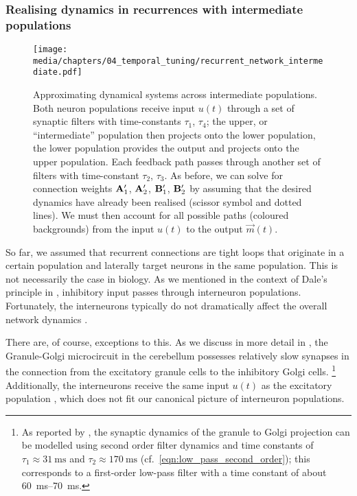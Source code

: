 \subsubsection{Realising dynamics in recurrences with intermediate populations}

\begin{figure}
	\texttt{[image: media/chapters/04\_temporal\_tuning/recurrent\_network\_intermediate.pdf]}
	\caption[Approximating dynamical systems across intermediate populations]{Approximating dynamical systems across intermediate populations. Both neuron populations receive input $u(t)$ through a set of synaptic filters with time-constants $\tau_1$, $\tau_4$; the upper, or \enquote{intermediate} population then projects onto the lower population, the lower population provides the output and projects onto the upper population. Each feedback path passes through another set of filters with time-constant $\tau_2$, $\tau_3$.
	As before, we can solve for connection weights $\mathbf{A}_1'$, $\mathbf{A}_2'$, $\mathbf{B}_1'$, $\mathbf{B}_2'$ by assuming that the desired dynamics have already been realised (scissor symbol and dotted lines).
	We must then account for all possible paths (coloured backgrounds) from the input $u(t)$ to the output $\vec m(t)$.
	}
	\label{fig:recurrent_network_intermediate}
\end{figure}

So far, we assumed that recurrent connections are tight loops that originate in a certain population and laterally target neurons in the same population.
This is not necessarily the case in biology.
As we mentioned in the context of Dale's principle in , inhibitory input passes through interneuron populations.
Fortunately, the interneurons typically do not dramatically affect the overall network dynamics \citep{parisien2008solving}.

There are, of course, exceptions to this.
As we discuss in more detail in , the Granule-Golgi microcircuit in the cerebellum possesses relatively slow synapses in the connection from the excitatory granule cells to the inhibitory Golgi cells.%
\footnote{As reported by \citet{dieudonne1998submillisecond}, the synaptic dynamics of the granule to Golgi projection can be modelled using second order filter dynamics and time constants of $\tau_1 \approx \SI{31}{\milli\second}$ and $\tau_2 \approx \SI{170}{\milli\second}$ (cf.~\cref{eqn:low_pass_second_order}); this corresponds to a first-order low-pass filter with a time constant of about \SIrange{60}{70}{\milli\second}.}
Additionally, the interneurons receive the same input $u(t)$ as the excitatory population \citep{dangelo2013cerebellar}, which does not fit our canonical picture of interneuron populations.

